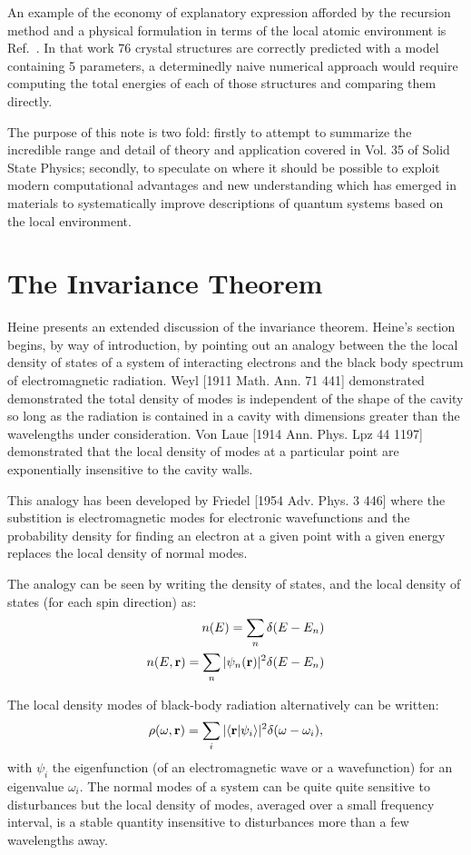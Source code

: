 An example of the economy of explanatory expression afforded by the recursion method
and a physical formulation in terms of the local atomic environment
is Ref.~\cite{johannes76}. In that work 76 crystal structures are correctly predicted 
with a model containing 5 parameters, a determinedly naive numerical approach would
require computing the total energies of each of those structures and comparing them directly.

The purpose of this note is two fold: firstly to attempt to summarize the incredible range and
detail of theory and application covered in Vol. 35 of Solid State Physics; secondly, to speculate on where 
it should be possible to exploit modern computational advantages and new understanding 
which has emerged in materials to systematically improve descriptions of quantum systems based
on the local environment. 

\section{The Invariance Theorem}
\label{sec:invariance}
Heine presents an extended discussion of the invariance
theorem. Heine's section begins, by way of introduction, by pointing 
out an analogy between the the local density of states of a system of interacting
electrons and the black body spectrum of electromagnetic radiation.
Weyl [1911 Math. Ann. 71 441] demonstrated demonstrated the total density
of modes is independent of the shape of the cavity so long as the
radiation is contained in a cavity with dimensions greater than the wavelengths
under consideration. Von Laue [1914 Ann. Phys. Lpz 44 1197] demonstrated that the local density of modes at 
a particular point are exponentially insensitive to the cavity walls.

This analogy has been developed by Friedel [1954 Adv. Phys. 3 446] where
the substition is electromagnetic modes for electronic wavefunctions and
the probability density for finding an electron at a given point
with a given energy replaces the local density of normal modes.\cite{annett94}

The analogy can be seen by writing the density of states,
and the local density of states (for each spin direction) as:
%
\begin{eqnarray}
n(E) = \sum_{n}\delta(E-E_{n}) \\
n(E,{\bf r}) = \sum_{n} |\psi_{n}({\bf r})|^{2}\delta(E-E_{n})
\end{eqnarray}
%

The local density modes of black-body radiation alternatively can be written:
%
\begin{equation}
\rho(\omega,{\bf r})= \sum_{i} |\langle {\bf r}| \psi_{i}\rangle|^{2}\delta(\omega-\omega_{i}),
\end{equation}
%
with $\psi_{i}$ the eigenfunction (of an electromagnetic wave or a wavefunction) for an eigenvalue $\omega_{i}$.\cite{annett94}
The normal modes of a system can be quite quite sensitive to disturbances but the 
local density of modes, averaged over a small frequency interval, is a stable quantity 
insensitive to disturbances more than a few wavelengths away.

